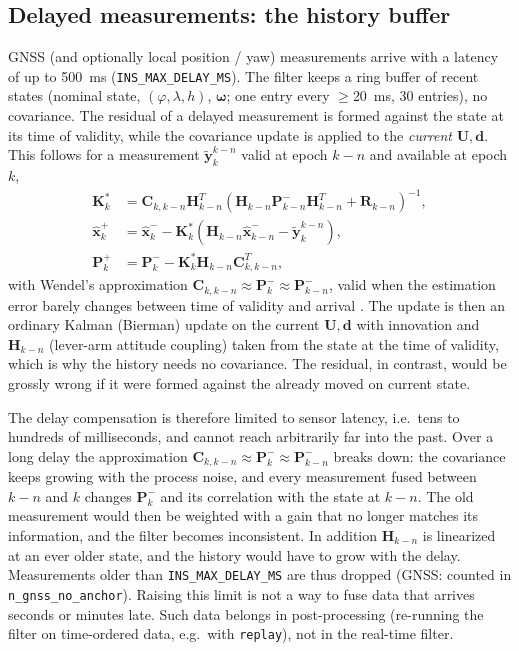 \documentclass[11pt,a4paper]{article}
\newcommand{\vect}[1]{\bm{#1}}
\newcommand{\mat}[1]{\bm{#1}}
\newcommand{\code}[1]{\texttt{#1}}
\begin{document}
\subsection{Delayed measurements: the history buffer}
\label{sec:delayed}

GNSS (and optionally local position / yaw) measurements arrive with
a latency of up to \SI{500}{\milli\second}
(\code{INS\_\allowbreak{}MAX\_\allowbreak{}DELAY\_\allowbreak{}MS}).
The filter keeps a ring buffer of recent states (nominal state,
$(\varphi,\lambda,h)$, $\vect{\omega}$; one entry every
$\geq$\SI{20}{\milli\second}, 30 entries), no covariance. The residual of a delayed
measurement is formed against the state at its time of validity, while the
covariance update is applied to the \emph{current} $\mat{U}, \vect{d}$.
This follows \cite[Sec.~8.4, eq.~8.168--8.170]{wendel2011} for a measurement
$\tilde{\vect{y}}_k^{k-n}$ valid at epoch $k-n$ and available at epoch $k$,
\begin{align*}
  \mat{K}_k^* &= \mat{C}_{k,k-n} \mat{H}_{k-n}^T
    \left(\mat{H}_{k-n} \mat{P}_{k-n}^- \mat{H}_{k-n}^T + \mat{R}_{k-n}\right)^{-1},\\
  \hat{\vect{x}}_k^+ &= \hat{\vect{x}}_k^- - \mat{K}_k^*
    \left(\mat{H}_{k-n} \hat{\vect{x}}_{k-n}^- - \tilde{\vect{y}}_k^{k-n}\right),\\
  \mat{P}_k^+ &= \mat{P}_k^- - \mat{K}_k^* \mat{H}_{k-n} \mat{C}_{k,k-n}^T,
\end{align*}
with Wendel's approximation \cite[eq.~8.171]{wendel2011} $\mat{C}_{k,k-n} \approx \mat{P}_k^- \approx
\mat{P}_{k-n}^-$, valid when the estimation error barely changes between
time of validity and arrival \cite{wendel2011,zwiener2019}. The update is
then an ordinary Kalman (Bierman) update on the current $\mat{U}, \vect{d}$
with innovation and $\mat{H}_{k-n}$ (lever-arm attitude coupling) taken from
the state at the time of validity, which is why the history needs no
covariance. The residual, in contrast, would be grossly wrong if it were
formed against the already moved on current state.

The delay compensation is therefore limited to sensor latency, i.e.\ tens to
hundreds of milliseconds, and cannot reach arbitrarily far into the past.
Over a long delay the approximation
$\mat{C}_{k,k-n} \approx \mat{P}_k^- \approx \mat{P}_{k-n}^-$ breaks down: the
covariance keeps growing with the process noise, and every measurement fused
between $k-n$ and $k$ changes $\mat{P}_k^-$ and its correlation with the
state at $k-n$. The old measurement would then be weighted with a gain that no
longer matches its information, and the filter becomes inconsistent. In
addition $\mat{H}_{k-n}$ is linearized at an ever older state, and the history
would have to grow with the delay. Measurements older than
\code{INS\_\allowbreak{}MAX\_\allowbreak{}DELAY\_\allowbreak{}MS} are thus
dropped (GNSS: counted in \code{n\_\allowbreak{}gnss\_\allowbreak{}no\_\allowbreak{}anchor}).
Raising this limit is not a way to fuse data that arrives seconds or minutes
late. Such data belongs in post-processing (re-running the filter on
time-ordered data, e.g.\ with \code{replay}), not in the real-time filter.
\end{document}

